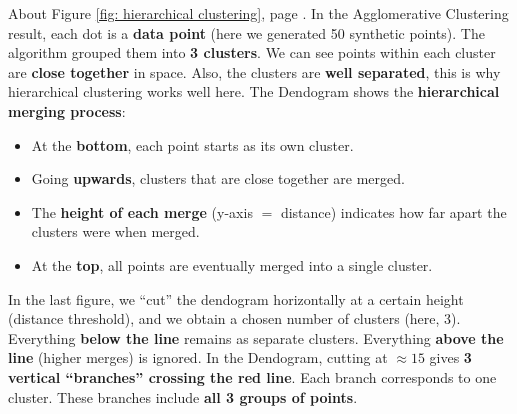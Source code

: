 \begin{itemize}
    \newpage

    \noindent
    About Figure \ref{fig: hierarchical clustering}, page \pageref{fig: hierarchical clustering}. In the Agglomerative Clustering result, each dot is a \textbf{data point} (here we generated 50 synthetic points). The algorithm grouped them into \textbf{3 clusters}. We can see points within each cluster are \textbf{close together} in space. Also, the clusters are \textbf{well separated}, this is why hierarchical clustering works well here. The Dendogram shows the \textbf{hierarchical merging process}:
    \begin{itemize}
        \item At the \textbf{bottom}, each point starts as its own cluster.
        \item Going \textbf{upwards}, clusters that are close together are merged.
        \item The \textbf{height of each merge} (y-axis $=$ distance) indicates how far apart the clusters were when merged.
        \item At the \textbf{top}, all points are eventually merged into a single cluster.
    \end{itemize}
    In the last figure, we ``cut'' the dendogram horizontally at a certain height (distance threshold), and we obtain a chosen number of clusters (here, 3). Everything \textbf{below the line} remains as separate clusters. Everything \textbf{above the line} (higher merges) is ignored. In the Dendogram, cutting at $\approx 15$ gives \textbf{3 vertical ``branches'' crossing the red line}. Each branch corresponds to one cluster. These branches include \textbf{all 3 groups of points}.
    


\end{itemize}
